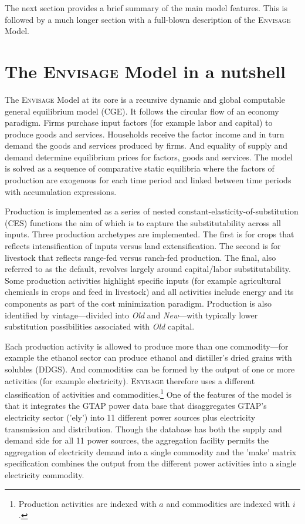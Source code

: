 \documentclass[11pt,letterpaper]{report}
\begin{document}
The next section provides a brief summary of the main model features. This is
followed by a much longer section with a full-blown description of the
\textsc{Envisage} Model.

\chapter{The \textsc{Envisage} Model in a nutshell}

The \textsc{Envisage} Model at its core is a recursive dynamic and global
computable general equilibrium model (CGE). It follows the circular flow of an
economy paradigm. Firms purchase input factors (for example labor and capital)
to produce goods and services. Households receive the factor income and in turn
demand the goods and services produced by firms. And equality of supply and
demand determine equilibrium prices for factors, goods and services. The model
is solved as a sequence of comparative static equilibria where the factors of
production are exogenous for each time period and linked between time periods
with accumulation expressions.

Production is implemented as a series of nested
constant-elasticity-of-substitution (CES) functions the aim of which is to
capture the substitutability across all inputs. Three production archetypes are
implemented. The first is for crops that reflects intensification of inputs
versus land extensification. The second is for livestock that reflects
range-fed versus ranch-fed production. The final, also referred to as the
default, revolves largely around capital/labor substitutability. Some production
activities highlight specific inputs (for example agricultural chemicals in
crops and feed in livestock) and all activities include energy and its
components as part of the cost minimization paradigm. Production is also
identified by vintage---divided into \emph{Old} and \emph{New}---with typically
lower substitution possibilities associated with \emph{Old} capital.

Each production activity is allowed to produce more than one commodity---for
example the ethanol sector can produce ethanol and distiller's dried grains with
solubles (DDGS). And commodities can be formed by the output of one or more
activities (for example electricity). \textsc{Envisage} therefore uses a
different classification of activities and commodities.\footnote{Production
activities are indexed with $a$ and commodities are indexed with $i$.} One of
the features of the model is that it integrates the GTAP power data base
that disaggregates GTAP's electricity sector ('ely') into 11 different power
sources plus electricity transmission and distribution. Though the database has
both the supply and demand side for all 11 power sources, the aggregation
facility permits the aggregation of electricity demand into a single commodity
and the 'make' matrix specification combines the output from the different power
activities into a single electricity commodity.
\end{document}
